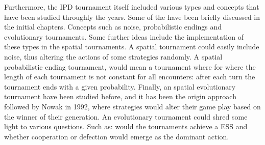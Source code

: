 Furthermore, the IPD tournament itself included various types and concepts that
have been studied throughly the years. Some of the have been briefly discussed
in the initial chapters. Concepts such as noise, probabilistic endings and evolutionary
tournaments. Some further ideas include the implementation of these types in the
spatial tournaments. A spatial tournament could easily include noise, thus altering
the actions of some strategies randomly. A spatial probabilistic ending tournament,
would mean a tournament where for where the length of each tournament is not
constant for all encounters: after each turn the tournament ends with a given
probability. Finally, an spatial evolutionary tournament have been studied before,
and it has been the origin approach followed by Nowak in 1992, where strategies
would alter their game play based on the winner of their generation. An evolutionary
tournament could shred some light to various questions. Such as: would the
tournaments achieve a ESS and whether cooperation or defection would emerge as
the dominant action. 
